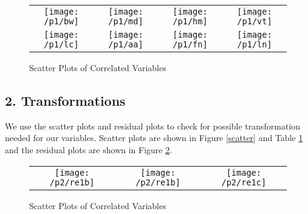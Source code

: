 \documentclass{article}
\begin{document}
\begin {figure}
	\begin{tabular}{c c c c}
		\begin{minipage}{.23\textwidth}
		\centering		
		\texttt{[image: /p1/bw]}
		\end{minipage}
		&
		\begin{minipage}{.23\textwidth}
		\centering
		\texttt{[image: /p1/md]}
		\end{minipage}
		&
		\begin{minipage}{.23\textwidth}
		\centering
		\texttt{[image: /p1/hm]}
		\end{minipage} 
		& 
		\begin{minipage}{.23\textwidth}
		\centering
		\texttt{[image: /p1/vt]}
		\end{minipage} 
		\\
		\begin{minipage}{.2\textwidth}
		\centering		
		\texttt{[image: /p1/lc]}
		\end{minipage}
		&
		\begin{minipage}{.23\textwidth}
		\centering
		\texttt{[image: /p1/aa]}
		\end{minipage}
		&
		\begin{minipage}{.23\textwidth}
		\centering
		\texttt{[image: /p1/fn]}
		\end{minipage} 
		& 
		\begin{minipage}{.23\textwidth}
		\centering
		\texttt{[image: /p1/ln]}
		\end{minipage} 
	\end{tabular} \hfill
	\caption {Scatter Plots of Correlated Variables} \label{scatter2} 
\end{figure}


\subsection{2. Transformations}
We use the scatter plots and residual plots to check for possible transformation needed for our variables. Scatter plots are shown in Figure \ref{scatter} and Table \ref{scatter2} and the residual plots are shown in Figure \ref{resid}. \\

\begin{figure}
	\begin{tabular}{c c c}
	\begin{minipage}{.33\textwidth}
	\centering
	\texttt{[image: /p2/re1b]}
	\end{minipage}
	&
	\begin{minipage}{.33\textwidth}
	\centering
	\texttt{[image: /p2/re1b]}
	\end{minipage}
	&
	\begin{minipage}{.33\textwidth}
	\centering
	\texttt{[image: /p2/re1c]}
	\end{minipage}
	\end{tabular}
\caption {Scatter Plots of Correlated Variables} \label{resid} 
\end{figure}
\end{document}
